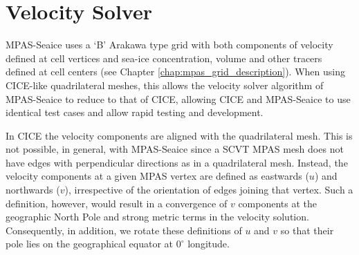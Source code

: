\section{Velocity Solver}
\label{sec:velocity_solver}

MPAS-Seaice uses a `B' Arakawa type grid \citep{Arakawa77} with both components of velocity defined at cell vertices and sea-ice concentration, volume and other tracers defined at cell centers (see Chapter \ref{chap:mpas_grid_description}). When using CICE-like quadrilateral meshes, this allows the velocity solver algorithm of MPAS-Seaice to reduce to that of CICE, allowing CICE and MPAS-Seaice to use identical test cases and allow rapid testing and development. 

In CICE the velocity components are aligned with the quadrilateral mesh. This is not possible, in general, with MPAS-Seaice since a SCVT MPAS mesh does not have edges with perpendicular directions as in a quadrilateral mesh. Instead, the velocity components at a given MPAS vertex are defined as eastwards ($u$) and northwards ($v$), irrespective of the orientation of edges joining that vertex. Such a definition, however, would result in a convergence of $v$ components at the geographic North Pole and strong metric terms in the velocity solution. Consequently, in addition, we rotate these definitions of $u$ and $v$ so that their pole lies on the geographical equator at $0^\circ$ longitude. 

